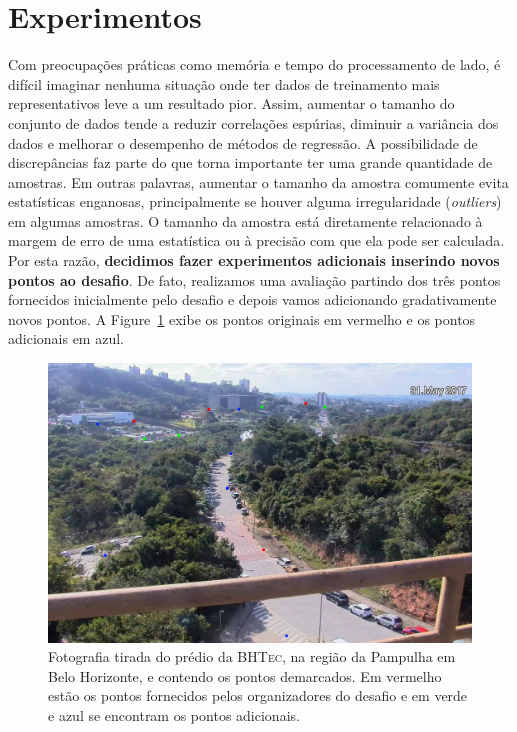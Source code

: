 \documentclass[12pt]{report}
\begin{document}
{\section*{Experimentos}
Com preocupações práticas como memória e tempo do processamento de lado, é difícil imaginar nenhuma situação onde ter dados de treinamento mais representativos leve a um resultado pior. 
Assim, aumentar o tamanho do conjunto de dados tende a reduzir correlações espúrias, diminuir a variância dos dados e melhorar o desempenho de métodos de regressão.
A possibilidade de discrepâncias faz parte do que torna importante ter uma grande quantidade de amostras.
Em outras palavras, aumentar o tamanho da amostra comumente evita estatísticas enganosas, principalmente se houver alguma irregularidade (\textit{outliers}) em algumas amostras.
O tamanho da amostra está diretamente relacionado à margem de erro de uma estatística ou à precisão com que ela pode ser calculada.
Por esta razão, \textbf{decidimos fazer experimentos adicionais inserindo novos pontos ao desafio}.
De fato, realizamos uma avaliação partindo dos três pontos fornecidos inicialmente pelo desafio e depois vamos adicionando gradativamente novos pontos.
A Figure~\ref{fig:bhtec2} exibe os pontos originais em vermelho e os pontos adicionais em azul.

\begin{figure}[!h]
	\centering
	\includegraphics[width=0.85\columnwidth]{images/cemig-pic-2.jpg}
	\caption{Fotografia tirada do prédio da \textsc{BHTec}, na região da Pampulha em Belo Horizonte, e contendo os pontos demarcados. Em vermelho estão os pontos fornecidos pelos organizadores do desafio e em verde e azul se encontram os pontos adicionais.}
	\label{fig:bhtec2}
\end{figure}

\newpage

}
\end{document}
